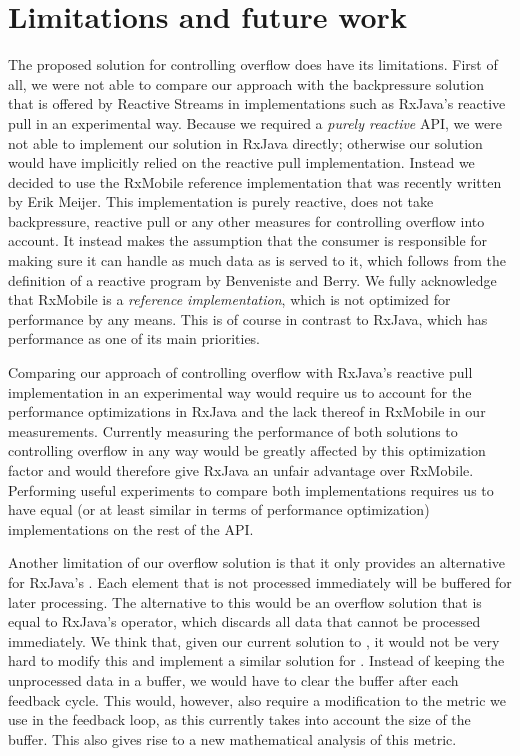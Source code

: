 \section{Limitations and future work}
The proposed solution for controlling overflow does have its limitations. First of all, we were not able to compare our approach with the backpressure solution that is offered by Reactive Streams in implementations such as RxJava's reactive pull in an experimental way. Because we required a \emph{purely reactive} API, we were not able to implement our solution in RxJava directly; otherwise our solution would have implicitly relied on the reactive pull implementation. Instead we decided to use the RxMobile reference implementation that was recently written by Erik Meijer. This implementation is purely reactive, does not take backpressure, reactive pull or any other measures for controlling overflow into account. It instead makes the assumption that the consumer is responsible for making sure it can handle as much data as is served to it, which follows from the definition of a reactive program by Benveniste and Berry. We fully acknowledge that RxMobile is a \emph{reference implementation}, which is not optimized for performance by any means. This is of course in contrast to RxJava, which has performance as one of its main priorities.

Comparing our approach of controlling overflow with RxJava's reactive pull implementation in an experimental way would require us to account for the performance optimizations in RxJava and the lack thereof in RxMobile in our measurements. Currently measuring the performance of both solutions to controlling overflow in any way would be greatly affected by this optimization factor and would therefore give RxJava an unfair advantage over RxMobile. Performing useful experiments to compare both implementations requires us to have equal (or at least similar in terms of performance optimization) implementations on the rest of the API.

Another limitation of our overflow solution is that it only provides an alternative for RxJava's . Each element that is not processed immediately will be buffered for later processing. The alternative to this would be an overflow solution that is equal to RxJava's  operator, which discards all data that cannot be processed immediately. We think that, given our current solution to , it would not be very hard to modify this and implement a similar solution for . Instead of keeping the unprocessed data in a buffer, we would have to clear the buffer after each feedback cycle. This would, however, also require a modification to the metric we use in the feedback loop, as this currently takes into account the size of the buffer. This also gives rise to a new mathematical analysis of this metric.

